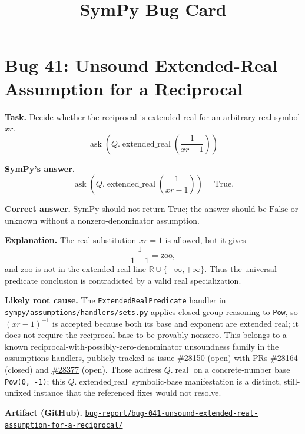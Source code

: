 \documentclass[11pt]{article}
\title{SymPy Bug Card}
\author{}
\date{}
\newcommand{\artifactrepo}{https://github.com/TODO-org/TODO-repo}
\newcommand{\bugbundle}[1]{\href{\artifactrepo/tree/main/bug-report/#1}{\nolinkurl{bug-report/#1/}}}
\begin{document}
\maketitle

\section*{Bug 41: Unsound Extended-Real Assumption for a Reciprocal}

\begin{counterexamplebox}
\textbf{Task.} Decide whether the reciprocal is extended real for an arbitrary
real symbol \(xr\).
\[
\operatorname{ask}\!\left(Q.\operatorname{extended\_real}\!\left(\frac{1}{xr-1}\right)\right)
\]

\medskip
\textbf{SymPy's answer.}
\[
\operatorname{ask}\!\left(Q.\operatorname{extended\_real}\!\left(\frac{1}{xr-1}\right)\right)=\mathrm{True}.
\]

\medskip
\textbf{Correct answer.} SymPy should not return \(\mathrm{True}\); the answer
should be \(\mathrm{False}\) or unknown without a nonzero-denominator assumption.

\medskip
\textbf{Explanation.} The real substitution \(xr=1\) is allowed, but it gives
\[
\frac{1}{1-1}=\mathrm{zoo},
\]
and \(\mathrm{zoo}\) is not in the extended real line
\(\mathbb{R}\cup\{-\infty,+\infty\}\).  Thus the universal predicate conclusion
is contradicted by a valid real specialization.

\medskip
\textbf{Likely root cause.} The \texttt{ExtendedRealPredicate} handler in
\nolinkurl{sympy/assumptions/handlers/sets.py} applies closed-group reasoning to
\texttt{Pow}, so \((xr-1)^{-1}\) is accepted because both its base and exponent
are extended real; it does not require the reciprocal base to be provably
nonzero.  This belongs to a known reciprocal-with-possibly-zero-denominator
unsoundness family in the assumptions handlers, publicly tracked as issue
\href{https://github.com/sympy/sympy/issues/28150}{\#28150} (open) with PRs
\href{https://github.com/sympy/sympy/pull/28164}{\#28164} (closed) and
\href{https://github.com/sympy/sympy/pull/28377}{\#28377} (open).  Those address
\(Q.\operatorname{real}\) on a concrete-number base \texttt{Pow(0, -1)}; this
\(Q.\operatorname{extended\_real}\) symbolic-base manifestation is a distinct,
still-unfixed instance that the referenced fixes would not resolve.

\medskip
\textbf{Artifact (GitHub).} \bugbundle{bug-041-unsound-extended-real-assumption-for-a-reciprocal}
\end{counterexamplebox}
\end{document}
